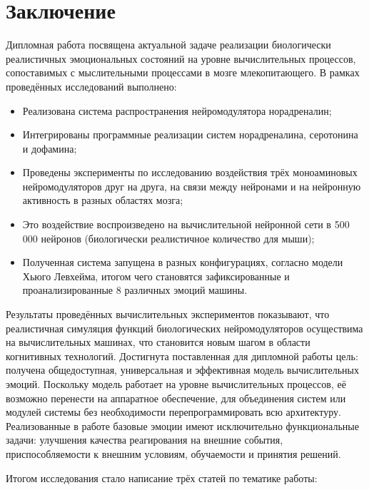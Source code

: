 \cleardoublepage
{}
{}
\chapter*{Заключение}
\label{chap:conclusion}
Дипломная работа посвящена актуальной задаче реализации биологически реалистичных эмоциональных состояний на уровне вычислительных процессов, сопоставимых с мыслительными процессами в мозге млекопитающего. В рамках проведённых исследований выполнено:
\begin{itemize}
\item Реализована система распространения нейромодулятора норадреналин;
\item Интегрированы программные реализации систем норадреналина, серотонина и дофамина;
\item Проведены эксперименты по исследованию воздействия трёх моноаминовых нейромодуляторов друг на друга, на связи между нейронами и на нейронную активность в разных областях мозга;
\item Это воздействие воспроизведено на вычислительной нейронной сети в 500 000 нейронов (биологически реалистичное количество для мыши);
\item Полученная система запущена в разных конфигурациях, согласно модели Хьюго Левхейма, итогом чего становятся зафиксированные и проанализированные 8 различных эмоций машины.
\end{itemize}
	
	
Результаты проведённых вычислительных экспериментов показывают, что реалистичная симуляция функций биологических нейромодуляторов осуществима на вычислительных машинах, что становится новым шагом в области когнитивных технологий. Достигнута поставленная для дипломной работы цель: получена общедоступная, универсальная и эффективная модель вычислительных эмоций. Поскольку модель работает на уровне вычислительных процессов, её возможно перенести на аппаратное обеспечение, для объединения систем или модулей системы без необходимости перепрограммировать всю архитектуру. Реализованные в работе базовые эмоции имеют исключительно функциональные задачи: улучшения качества реагирования на внешние события, приспособляемости к внешним условиям, обучаемости и принятия решений.


Итогом исследования стало написание трёх статей по тематике работы:

